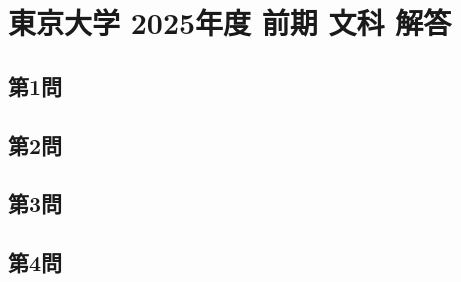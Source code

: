 ﻿\documentclass[../../uem_mat_tok_a.tex]{subfiles}
\begin{document}
    \section{東京大学 2025年度 前期 文科 解答}

    \subsection{第1問}
    

    \clearpage

    \subsection{第2問}
    

    \clearpage

    \subsection{第3問}
    

    \clearpage

    \subsection{第4問}
    
\end{document}
